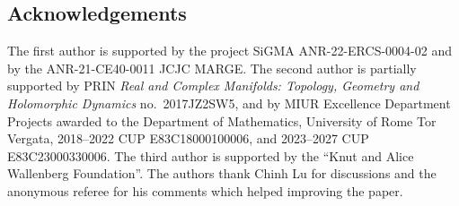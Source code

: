 \documentclass[pdftex]{sigma}
\numberwithin{equation}{section}
\theoremstyle{plain}
\begin{document}
\subsection*{Acknowledgements}

The first author is supported by the project SiGMA ANR-22-ERCS-0004-02 and by the ANR-21-CE40-0011 JCJC MARGE. The second author is partially supported by PRIN \emph{Real and Complex Ma\-ni\-folds: Topology, Geometry and Holomorphic Dynamics} no.~2017JZ2SW5, and by MIUR Excellence Department Projects awarded to the Department of Mathematics, University of Rome Tor Vergata, 2018--2022 CUP E83C18000100006, and 2023--2027 CUP E83C23000330006. The third author is supported by the ``Knut and Alice Wallenberg Foundation''.
 The authors thank Chinh Lu for discussions and the anonymous referee for his comments which helped improving the paper.
\end{document}
